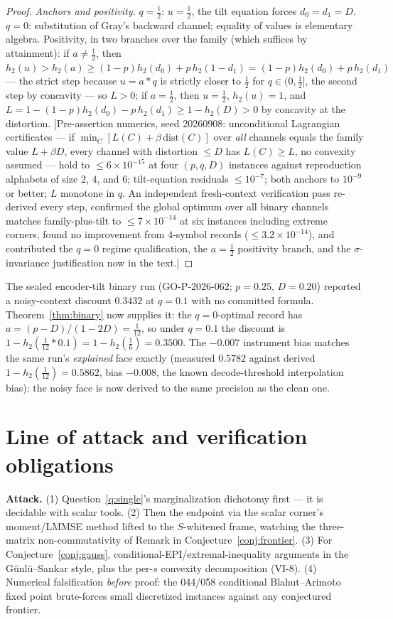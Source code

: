 \documentclass[11pt]{article}
\begin{document}
\begin{proof}
\emph{Anchors and positivity.} $q=\tfrac12$: $u=\tfrac12$, the tilt
equation forces $d_0=d_1=D$. $q=0$: substitution of Gray's backward
channel; equality of values is elementary algebra. Positivity, in two
branches over the family (which suffices by attainment): if
$a\ne\tfrac12$, then $h_2(u)>h_2(a)\ge(1-p)h_2(d_0)+p\,h_2(1-d_1)
=(1-p)h_2(d_0)+p\,h_2(d_1)$ --- the strict step because $u=a*q$ is
strictly closer to $\tfrac12$ for $q\in(0,\tfrac12]$, the second step
by concavity --- so $L>0$; if $a=\tfrac12$, then $u=\tfrac12$, $h_2(u)=1$,
and $L=1-(1-p)h_2(d_0)-p\,h_2(d_1)\ge1-h_2(D)>0$ by concavity at the
distortion. [Pre-assertion numerics, seed 20260908:
unconditional Lagrangian certificates --- if
$\min_C[L(C)+\beta\,\mathrm{dist}(C)]$ over \emph{all} channels equals
the family value $L+\beta D$, every channel with distortion $\le D$ has
$L(C)\ge L$, no convexity assumed --- hold to $\le6\times10^{-15}$ at
four $(p,q,D)$ instances against reproduction alphabets of size $2$,
$4$, and $6$; tilt-equation residuals $\le10^{-7}$; both anchors to
$10^{-9}$ or better; $L$ monotone in $q$. An independent fresh-context
verification pass re-derived every step, confirmed the global optimum
over all binary channels matches family-plus-tilt to $\le7\times10^{-14}$
at six instances including extreme corners, found no improvement from
$4$-symbol records ($\le3.2\times10^{-14}$), and contributed the $q{=}0$
regime qualification, the $a{=}\tfrac12$ positivity branch, and the
$\sigma$-invariance justification now in the text.]
\end{proof}

\begin{remark}
The sealed encoder-tilt binary run (GO-P-2026-062; $p=0.25$, $D=0.20$)
reported a noisy-context discount $0.3432$ at $q=0.1$ with no committed
formula. Theorem~\ref{thm:binary} now supplies it: the $q{=}0$-optimal
record has $a=(p-D)/(1-2D)=\tfrac1{12}$, so under $q=0.1$ the discount
is $1-h_2(\tfrac1{12}*0.1)=1-h_2(\tfrac16)=0.3500$. The $-0.007$
instrument bias matches the same run's \emph{explained} face exactly
(measured $0.5782$ against derived $1-h_2(\tfrac1{12})=0.5862$, bias
$-0.008$, the known decode-threshold interpolation bias): the noisy face
is now derived to the same precision as the clean one.
\end{remark}

\section{Line of attack and verification obligations}
\textbf{Attack.} (1) Question~\ref{q:single}'s marginalization dichotomy
first --- it is decidable with scalar tools. (2) Then the endpoint via the
scalar corner's moment/LMMSE method lifted to the $S$-whitened frame,
watching the three-matrix non-commutativity of
Remark in Conjecture~\ref{conj:frontier}. (3) For
Conjecture~\ref{conj:gauss}, conditional-EPI/extremal-inequality arguments
in the G\"unl\"u--Sankar style, plus the per-$s$ convexity decomposition
(VI-8). (4) Numerical falsification \emph{before} proof: the 044/058
conditional Blahut--Arimoto fixed point brute-forces small discretized
instances against any conjectured frontier.
\end{document}
